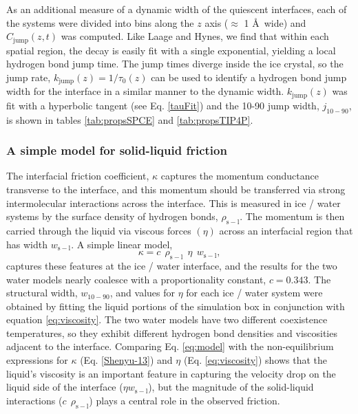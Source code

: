 As an additional measure of a dynamic width of the quiescent
interfaces, each of the systems were divided into bins along the $z$
axis ($\approx$ 1 \AA\ wide) and $C_\mathrm{jump}(z,t)$ was computed.
Like Laage and Hynes, we find that within each spatial region, the
decay is easily fit with a single exponential, yielding a local
hydrogen bond jump time. The jump times diverge inside the ice
crystal, so the jump rate, $k_\mathrm{jump}(z) = 1 / \tau_0(z)$ can be
used to identify a hydrogen bond jump width for the interface in a
similar manner to the dynamic width. $k_\mathrm{jump}(z)$ was fit with
a hyperbolic tangent (see Eq. \eqref{tauFit}) and the 10-90 jump
width, $j_\mathrm{10-90}$, is shown in tables \ref{tab:propsSPCE} and
\ref{tab:propsTIP4P}.

\subsubsection{A simple model for solid-liquid friction}
The interfacial friction coefficient, $\kappa$ captures the momentum
conductance transverse to the interface, and this momentum should be
transferred via strong intermolecular interactions across the
interface. This is measured in ice / water systems by the surface
density of hydrogen bonds, $\rho_\mathrm{s-l}$.  The momentum is then
carried through the liquid via viscous forces $(\eta)$ across an
interfacial region that has width $w_\mathrm{s-l}$. A simple linear
model,
\begin{equation}
  \kappa = c~~\rho_\mathrm{s-l}~~\eta~~w_\mathrm{s-l},
\label{eq:model}
\end{equation}
captures these features at the ice / water interface, and the results
for the two water models nearly coalesce with a proportionality
constant, $c = 0.343$.  The structural width, $w_\mathrm{10-90}$, and
values for $\eta$ for each ice / water system were obtained by fitting
the liquid portions of the simulation box in conjunction with equation
\eqref{eq:viscosity}.  The two water models have two different
coexistence temperatures, so they exhibit different hydrogen bond
densities and viscosities adjacent to the interface.  Comparing
Eq. \eqref{eq:model} with the non-equilibrium expressions for $\kappa$
(Eq. \eqref{Shenyu-13}) and $\eta$ (Eq. \eqref{eq:viscosity}) shows
that the liquid's viscosity is an important feature in capturing the
velocity drop on the liquid side of the interface
($\eta w_\mathrm{s-l}$), but the magnitude of the solid-liquid
interactions ($c~~\rho_\mathrm{s-l}$) plays a central role in the
observed friction.

